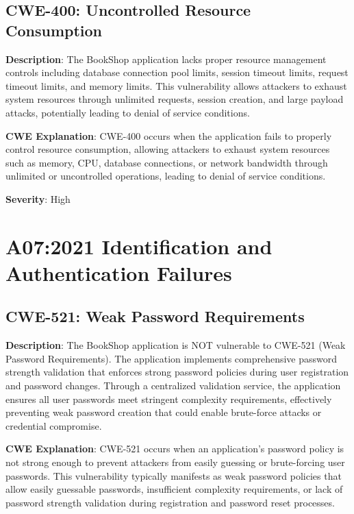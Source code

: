 \documentclass[]{UCD_CS_FYP_Report}
\begin{document}
\section{CWE-400: Uncontrolled Resource Consumption}

\textbf{Description}: The BookShop application lacks proper resource management controls including database connection pool limits, session timeout limits, request timeout limits, and memory limits. This vulnerability allows attackers to exhaust system resources through unlimited requests, session creation, and large payload attacks, potentially leading to denial of service conditions.

\textbf{CWE Explanation}: CWE-400 occurs when the application fails to properly control resource consumption, allowing attackers to exhaust system resources such as memory, CPU, database connections, or network bandwidth through unlimited or uncontrolled operations, leading to denial of service conditions.

\textbf{Severity}: High



\chapter{A07:2021 Identification and Authentication Failures}


\section{CWE-521: Weak Password Requirements}

\textbf{Description}: The BookShop application is NOT vulnerable to CWE-521 (Weak Password Requirements). The application implements comprehensive password strength validation that enforces strong password policies during user registration and password changes. Through a centralized validation service, the application ensures all user passwords meet stringent complexity requirements, effectively preventing weak password creation that could enable brute-force attacks or credential compromise.

\textbf{CWE Explanation}: CWE-521 occurs when an application's password policy is not strong enough to prevent attackers from easily guessing or brute-forcing user passwords. This vulnerability typically manifests as weak password policies that allow easily guessable passwords, insufficient complexity requirements, or lack of password strength validation during registration and password reset processes.
\end{document}
